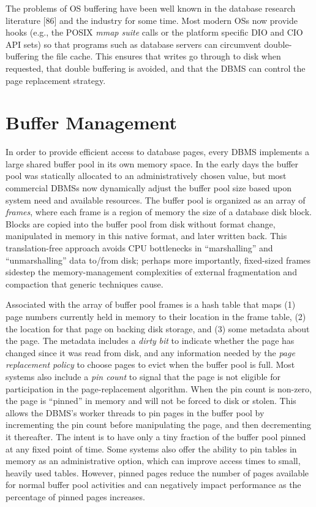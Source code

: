 \documentclass[a4paper,11pt,twoside,openright]{book}
\begin{document}
The problems of OS buffering have been well known in the database
research literature {[}86{]} and the industry for some time. Most modern
OSs now provide hooks (e.g., the POSIX \emph{mmap suite} calls or the
platform specific DIO and CIO API sets) so that programs such as
database servers can circumvent double-buffering the file cache. This
ensures that writes go through to disk when requested, that double
buffering is avoided, and that the DBMS can control the page replacement
strategy.

\hypertarget{buffer-management}{%
\section{Buffer Management}\label{buffer-management}}

In order to provide efficient access to database pages, every DBMS
implements a large shared buffer pool in its own memory space. In the
early days the buffer pool was statically allocated to an
administratively chosen value, but most commercial DBMSs now dynamically
adjust the buffer pool size based upon system need and available
resources. The buffer pool is organized as an array of \emph{frames},
where each frame is a region of memory the size of a database disk
block. Blocks are copied into the buffer pool from disk without format
change, manipulated in memory in this native format, and later written
back. This translation-free approach avoids CPU bottlenecks in
``marshalling'' and ``unmarshalling'' data to/from disk; perhaps more
importantly, fixed-sized frames sidestep the memory-management
complexities of external fragmentation and compaction that generic
techniques cause.

Associated with the array of buffer pool frames is a hash table that
maps (1) page numbers currently held in memory to their location in the
frame table, (2) the location for that page on backing disk storage, and
(3) some metadata about the page. The metadata includes a \emph{dirty}
\emph{bit} to indicate whether the page has changed since it was read
from disk, and any information needed by the \emph{page replacement
policy} to choose pages to evict when the buffer pool is full. Most
systems also include a \emph{pin count} to signal that the page is not
eligible for participation in the page-replacement algorithm. When the
pin count is non-zero, the page is ``pinned'' in memory and will not be
forced to disk or stolen. This allows the DBMS's worker threads to pin
pages in the buffer pool by incrementing the pin count before
manipulating the page, and then decrementing it thereafter. The intent
is to have only a tiny fraction of the buffer pool pinned at any fixed
point of time. Some systems also offer the ability to pin tables in
memory as an administrative option, which can improve access times to
small, heavily used tables. However, pinned pages reduce the number of
pages available for normal buffer pool activities and can negatively
impact performance as the percentage of pinned pages increases.
\end{document}
